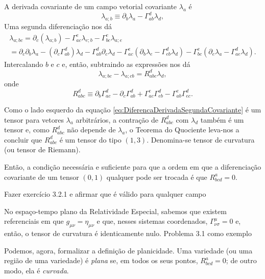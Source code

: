 A derivada covariante de um campo vetorial covariante $\lambda_a$ é
\[
\lambda_{a ; b} \equiv \partial_{b} \lambda_{a}-\Gamma_{a b}^{d} \lambda_{d},
\]
Uma segunda diferenciação nos dá 
\[
\begin{array}{c}{\lambda_{a ; b c}=\partial_{c}\left(\lambda_{a ; b}\right)-\Gamma_{a c}^{e} \lambda_{e ; b}-\Gamma_{b c}^{e} \lambda_{a ; e}} \\ {=\partial_{c} \partial_{b} \lambda_{a}-\left(\partial_{c} \Gamma_{a b}^{d}\right) \lambda_{d}-\Gamma_{a b}^{d} \partial_{c} \lambda_{d}-\Gamma_{a c}^{e}\left(\partial_{b} \lambda_{e}-\Gamma_{e b}^{d} \lambda_{d}\right)-\Gamma_{b c}^{e}\left(\partial_{e} \lambda_{a}-\Gamma_{a e}^{d} \lambda_{d}\right).}\end{array}
\]
Intercalando $b$ e $c$ e, então, subtraindo as expressões nos dá
\begin{equation}\label{eq:DiferencaDerivadaSegundaCovariante}
	\lambda_{a;bc}-\lambda_{a;cb}=R^d_{abc}\lambda_d,
\end{equation}
onde 
\begin{equation}\label{eq:DefinicaoTensorRiemann}
	\boxed{
		R_{a b c}^{d} \equiv \partial_{b} \Gamma_{a c}^{d}-\partial_{c} \Gamma_{a b}^{d}+\Gamma_{a c}^{e} \Gamma_{e b}^{d}-\Gamma_{a b}^{e} \Gamma_{e c}^{d}.
	}
\end{equation}

Como o lado esquerdo da equação \eqref{eq:DiferencaDerivadaSegundaCovariante} é um tensor para vetores $\lambda_a$ arbitrários, a contração de $R^d_{abc}$ com $\lambda_d$ também é um tensor e, como $R^d_{abc}$ não depende de $\lambda_a$, o Teorema do Quociente leva-nos a concluir que $R^d_{abc}$ é um tensor do tipo $(1,3)$. Denomina-se tensor de curvatura (ou tensor de Riemann).

Então, a condição necessária e suficiente para que a ordem em que a diferenciação covariante de um tensor $(0,1)$ qualquer pode ser trocada é que $R^a_{bcd}=0$.

{\color{red} Fazer exercício 3.2.1 e afirmar que é válido para qualquer campo}

No espaço-tempo plano da Relatividade Especial, sabemos que existem referenciais em que $g_{\mu\nu}=\eta_{\mu\nu}$ e que, nesses sistemas coordenados, $\Gamma^\mu_{\nu\sigma}=0$ e, então, o tensor de curvatura é identicamente nulo.
 {\color{red} Problema 3.1 como exemplo}

 Podemos, agora, formalizar a definição de {\color{ForestGreen}planicidade}. Uma variedade (ou uma região de uma variedade) é \textit{plana} se, em todos os seus pontos, $R^a_{bcd}=0$; de outro modo, ela é \textit{curvada}. 

